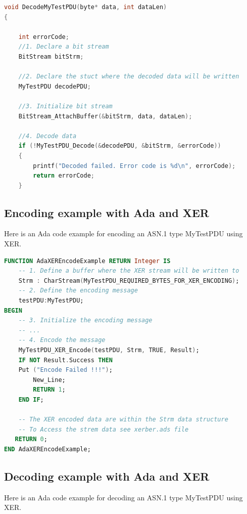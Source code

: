 \documentclass[11pt]{book}
\begin{document}
\begin{lstlisting}[language=c]
void DecodeMyTestPDU(byte* data, int dataLen)
{

	int errorCode;
	//1. Declare a bit stream
	BitStream bitStrm;
	
	//2. Declare the stuct where the decoded data will be written
	MyTestPDU decodePDU;

	//3. Initialize bit stream
	BitStream_AttachBuffer(&bitStrm, data, dataLen);

	//4. Decode data
	if (!MyTestPDU_Decode(&decodePDU, &bitStrm, &errorCode))
	{
		printf("Decoded failed. Error code is %d\n", errorCode);
		return errorCode;
	}
\end{lstlisting}

      \subsection{Encoding example with Ada and XER}
      Here is an Ada code example for encoding an ASN.1 type MyTestPDU using XER.

\begin{lstlisting}[language=Ada]
FUNCTION AdaXEREncodeExample RETURN Integer IS
    -- 1. Define a buffer where the XER stream will be written to
    Strm : CharStream(MyTestPDU_REQUIRED_BYTES_FOR_XER_ENCODING);
    -- 2. Define the encoding message
    testPDU:MyTestPDU;
BEGIN
    -- 3. Initialize the encoding message 
    -- ...
    -- 4. Encode the message
    MyTestPDU_XER_Encode(testPDU, Strm, TRUE, Result);
    IF NOT Result.Success THEN
	Put ("Encode Failed !!!");
        New_Line;
        RETURN 1;
    END IF;

    -- The XER encoded data are within the Strm data structure
    -- To Access the strem data see xerber.ads file
   RETURN 0;
END AdaXEREncodeExample;
\end{lstlisting}
	  
      \subsection{Decoding example with Ada and XER}
      Here is an Ada code example for decoding an ASN.1 type MyTestPDU using XER.
\end{document}
